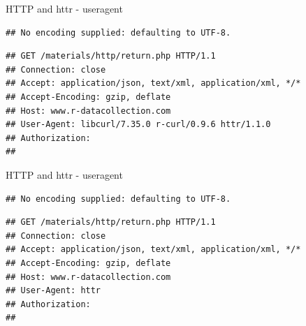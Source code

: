 \documentclass[ignorenonframetext,]{beamer}
\newenvironment{Shaded}{\begin{snugshade}}{\end{snugshade}}
\newcommand{\KeywordTok}[1]{\textcolor[rgb]{0.13,0.29,0.53}{\textbf{{#1}}}}
\newcommand{\DataTypeTok}[1]{\textcolor[rgb]{0.13,0.29,0.53}{{#1}}}
\newcommand{\StringTok}[1]{\textcolor[rgb]{0.31,0.60,0.02}{{#1}}}
\newcommand{\NormalTok}[1]{{#1}}
\begin{document}
\begin{frame}[fragile]{HTTP and httr - useragent}

\begin{Shaded}
\end{Shaded}

\begin{verbatim}
## No encoding supplied: defaulting to UTF-8.
\end{verbatim}

\begin{verbatim}
## GET /materials/http/return.php HTTP/1.1
## Connection: close
## Accept: application/json, text/xml, application/xml, */*
## Accept-Encoding: gzip, deflate
## Host: www.r-datacollection.com
## User-Agent: libcurl/7.35.0 r-curl/0.9.6 httr/1.1.0
## Authorization: 
## 
\end{verbatim}

\end{frame}

\begin{frame}[fragile]{HTTP and httr - useragent}

\begin{Shaded}
\end{Shaded}

\begin{verbatim}
## No encoding supplied: defaulting to UTF-8.
\end{verbatim}

\begin{verbatim}
## GET /materials/http/return.php HTTP/1.1
## Connection: close
## Accept: application/json, text/xml, application/xml, */*
## Accept-Encoding: gzip, deflate
## Host: www.r-datacollection.com
## User-Agent: httr
## Authorization: 
## 
\end{verbatim}

\end{frame}
\end{document}
